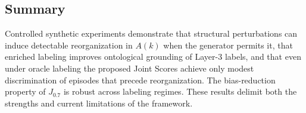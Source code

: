 \subsection{Summary}

Controlled synthetic experiments demonstrate that structural perturbations can induce detectable reorganization in \(A(k)\) when the generator permits it, that enriched labeling improves ontological grounding of Layer-3 labels, and that even under oracle labeling the proposed Joint Scores achieve only modest discrimination of episodes that precede reorganization. The bias-reduction property of \(J_{0.7}\) is robust across labeling regimes. These results delimit both the strengths and current limitations of the framework.
